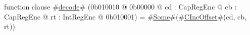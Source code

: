function clause #\hyperref[sailMIPSzdecode]{decode}# (0b010010 @ 0b00000 @ cd : CapRegEnc @ cb : CapRegEnc @ rt : IntRegEnc @ 0b010001) = #\hyperref[sailMIPSzSome]{Some}#(#\hyperref[sailMIPSzCIncOffset]{CIncOffset}#(cd, cb, rt))
